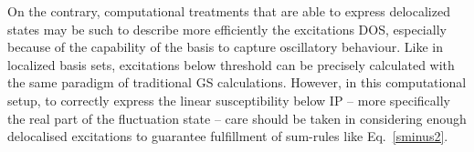 \documentclass[reprint,aps,prb]{revtex4-1}
\begin{document}
On the contrary, computational treatments that are able to express
delocalized states may be such to describe more efficiently the
excitations DOS, especially because of the capability of the basis to
capture oscillatory behaviour. Like in localized basis sets,
excitations below threshold can be precisely calculated
with the same paradigm of traditional GS calculations.
However, in this computational setup, to correctly express
the linear susceptibility below IP -- more specifically the real part of the fluctuation state -- care should be taken in considering enough delocalised excitations to guarantee fulfillment of sum-rules like Eq.~\eqref{sminus2}.


%

\end{document}
